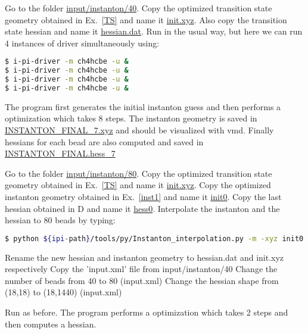 \documentclass{article}
\begin{document}
\begin{Exercise}[label={inst1},title={First instanton optimization}]

\Question
Go to the folder \url{input/instanton/40}.
Copy the optimized transition state geometry obtained in Ex.~\ref{TS} and name it \url{init.xyz}.
Also copy the transition state hessian and name it \url{hessian.dat}.
Run \ipi{} in the usual way, but here we can run 4 instances of driver simultaneously using:
\begin{lstlisting}[language=bash]
$ i-pi-driver -m ch4hcbe -u &
$ i-pi-driver -m ch4hcbe -u &
$ i-pi-driver -m ch4hcbe -u &
$ i-pi-driver -m ch4hcbe -u &
\end{lstlisting}

The program first generates the initial instanton guess and then performs a optimization which takes 8 steps.
The instanton geometry is saved in \url{INSTANTON_FINAL_7.xyz} and should be visualized with vmd.
Finally hessians for each bead are also computed and saved in \url{INSTANTON_FINAL.hess_7}

\end{Exercise}

\begin{Exercise}[label={inst2},title={Second and subsequent instanton optimizations}]

\Question
Go to the folder \url{input/instanton/80}.
\Question
Copy the optimized transition state geometry obtained in Ex.~\ref{TS} and name it \url{init.xyz}.
\Question
Copy the optimized instanton geometry obtained in Ex.~\ref{inst1} and name it \url{init0}.
\Question
Copy the last hessian obtained in D and name it \url{hess0}.
\Question
Interpolate the instanton and the hessian to 80 beads by typing:
\begin{lstlisting}[language=bash]
$ python ${ipi-path}/tools/py/Instanton_interpolation.py -m -xyz init0 -hess hess0 -n 80
\end{lstlisting}
\Question
Rename the new hessian and instanton geometry to hessian.dat and init.xyz respectively
\Question
Copy the 'input.xml' file from input/instanton/40
\Question
Change the number of beads from 40 to 80 (input.xml)
\Question
Change the hessian shape from (18,18) to (18,1440) (input.xml)

Run as before.  The program performs a optimization which takes 2 steps and then computes a hessian.

\end{Exercise}
\end{document}
